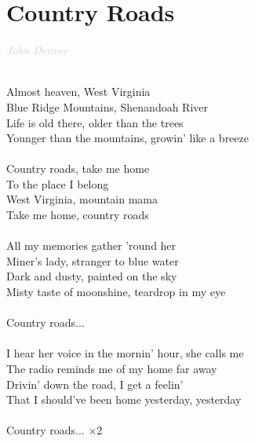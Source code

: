 \documentclass[a5paper, 10pt]{book}
\begin{document}
\section{Country Roads}\textcolor{lightgray}{\textit{John Denver}}\\~\\
\begin{minipage}[t]{0.7\textwidth}
  Almost heaven, West Virginia\\
  Blue Ridge Mountains, Shenandoah River\\
  Life is old there, older than the trees\\
  Younger than the mountains, growin' like a breeze\\
  \\
  \hspace*{5mm}Country roads, take me home\\
  \hspace*{5mm}To the place I belong\\
  \hspace*{5mm}West Virginia, mountain mama\\
  \hspace*{5mm}Take me home, country roads\\
  \\
All my memories gather 'round her\\
Miner's lady, stranger to blue water\\
Dark and dusty, painted on the sky\\
Misty taste of moonshine, teardrop in my eye\\
\\
\hspace*{5mm}Country roads... \\
\\
I hear her voice in the mornin' hour, she calls me\\
The radio reminds me of my home far away\\
Drivin' down the road, I get a feelin'\\
That I should've been home yesterday, yesterday\\
\\
\hspace*{5mm}Country roads... $\times$2\\
\end{minipage}
\end{document}
